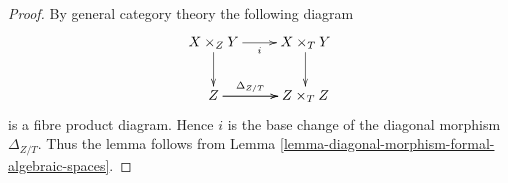 \documentclass{stacks-project}
\theoremstyle{plain}
\theoremstyle{definition}
\theoremstyle{remark}
\numberwithin{equation}{subsection}
\begin{document}
\begin{proof}
By general category theory the following diagram
$$
\xymatrix{
X \times_Z Y \ar[r]_i \ar[d] & X \times_T Y \ar[d] \\
Z \ar[r]^-{\Delta_{Z/T}} \ar[r] & Z \times_T Z
}
$$
is a fibre product diagram. Hence $i$ is the base change of the
diagonal morphism $\Delta_{Z/T}$. Thus the lemma follows
from Lemma \ref{lemma-diagonal-morphism-formal-algebraic-spaces}.
\end{proof}
\end{document}
